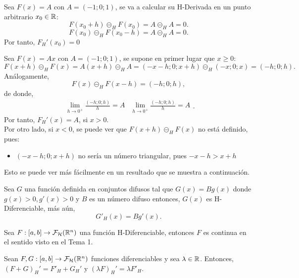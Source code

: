 \begin{ejemplo}
  Sea $F(x)=A$ con $A=(-1;0;1)$, se va a calcular su H-Derivada en un punto arbitrario $x_0 \in \mathbb R$: 
  \[
  F(x_0 + h) \circleddash_H F(x_0) = A \circleddash_H A = 0.
  \]
  \[
  F(x_0) \circleddash_H F(x_0 - h) = A \circleddash_H A = 0.
  \]
  Por tanto, $F_H'(x_0) = 0$
\end{ejemplo}

\begin{ejemplo}
  \label{ejemplo:hukuhara}
  Sea $F(x)=A x$ con $A=(-1; 0; 1)$, se supone en primer lugar que $x \geq 0$:
  \[
  F(x + h) \circleddash_H F(x) = A(x + h) \circleddash_H A = (-x - h; 0; x+h) \circleddash_H (-x; 0; x) = (-h; 0; h).
  \]
  Análogamente, 
  \[
  F(x) \circleddash_H F(x - h) = (-h; 0; h),
  \]
  de donde,
  \[
  \begin{array}{c||c}
    \lim\limits_{h \rightarrow 0^+} \frac{(-h; 0; h)}{h}=A & \lim\limits_{h \rightarrow 0^+} \frac{(-h; 0; h)}{h}=A
  \end{array}.
  \]
  Por tanto, $F_H'(x) = A $, si $x > 0$. \\
  Por otro lado, si $x<0$, se puede ver que $F(x+h) \circleddash_H F(x)$ no está definido, pues:
  
  \begin{itemize}
  \item $(-x-h; 0; x+h)$ no sería un número triangular, pues $-x-h > x+h$
  \end{itemize}

  Esto se puede ver más fácilmente en un resultado que se muestra a continuación.
\end{ejemplo}

\begin{proposicion}
  Sea $G$ una función definida en conjuntos difusos tal que $G(x)=B g(x)$ donde $g(x)>0, g'(x)>0$ y $B$ es un número difuso entonces, $G(x)$ es H-Diferenciable, más aún, 
  \[
  G'_H(x) = B g'(x).
  \]
\end{proposicion}

\begin{teorema} Sea  $F: [a, b] \rightarrow \mathcal{F}_\mathcal{H}(\mathbb R^n)$ una función H-Diferenciable, entonces $F$ es continua en el sentido visto en el Tema 1.
\end{teorema}

\begin{teorema}
  Sean $F, G : [a, b] \rightarrow \mathcal{F}_\mathcal{H}(\mathbb R^n)$ funciones diferenciables y sea $\lambda \in \mathbb R$. Entonces, $(F+G)_H' = F'_H + G_H'$ y $(\lambda F)_H' = \lambda F'_H$.
\end{teorema}

